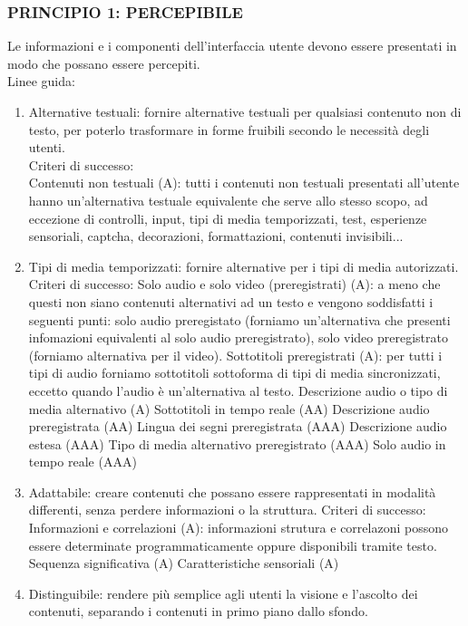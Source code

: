 \documentclass{article}
\begin{document}
\subsubsection{PRINCIPIO 1: PERCEPIBILE}
Le informazioni e i componenti dell'interfaccia utente devono essere presentati in modo che possano essere percepiti.\\
Linee guida:
\begin{enumerate}
	\item Alternative testuali: fornire alternative testuali per qualsiasi contenuto non di testo, per poterlo trasformare in forme fruibili secondo le necessità degli utenti.\\
	\subitem Criteri di successo: \\
	\subsubitem Contenuti non testuali (A): tutti i contenuti non testuali presentati all'utente hanno un'alternativa testuale equivalente che serve allo stesso scopo, ad eccezione di controlli, input, tipi di media temporizzati, test, esperienze sensoriali, captcha, decorazioni, formattazioni, contenuti invisibili...
	\item Tipi di media temporizzati: fornire alternative per i tipi di media autorizzati.
	\subitem Criteri di successo:
	\subsubitem Solo audio e solo video (preregistrati) (A): a meno che questi non siano contenuti alternativi ad un testo e vengono soddisfatti i seguenti punti: solo audio preregistato (forniamo un'alternativa che presenti infomazioni equivalenti al solo audio preregistrato),
	solo video preregistrato (forniamo alternativa per il video).
	\subsubitem Sottotitoli preregistrati (A): per tutti i tipi di audio forniamo sottotitoli sottoforma di tipi di media sincronizzati, eccetto quando l'audio è un'alternativa al testo.
	\subsubitem Descrizione audio o tipo di media alternativo (A)
	\subsubitem Sottotitoli in tempo reale (AA)
	\subsubitem Descrizione audio preregistrata (AA)
	\subsubitem Lingua dei segni preregistrata (AAA)
	\subsubitem Descrizione audio estesa (AAA)
	\subsubitem Tipo di media alternativo preregistrato (AAA)
	\subsubitem Solo audio in tempo reale (AAA)
	\item Adattabile: creare contenuti che possano essere rappresentati in modalità differenti, senza perdere informazioni o la struttura.
	\subitem Criteri di successo:
	\subsubitem Informazioni e correlazioni (A): informazioni strutura e correlazoni possono essere determinate programmaticamente oppure disponibili tramite testo.
	\subsubitem Sequenza significativa (A)
	\subsubitem Caratteristiche sensoriali (A)
	\item Distinguibile: rendere più semplice agli utenti la visione e l'ascolto dei contenuti, separando i contenuti in primo piano dallo sfondo.

\end{enumerate}
\end{document}
